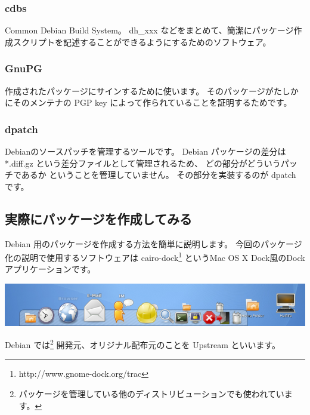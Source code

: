 \documentclass[mingoth,a4paper]{jsarticle}
\begin{document}
\subsubsection{cdbs}
	Common Debian Build System。
	dh\_xxx などをまとめて、簡潔にパッケージ作成スクリプトを記述することができるようにするためのソフトウェア。
	
\subsubsection{GnuPG}
	作成されたパッケージにサインするために使います。
	そのパッケージがたしかにそのメンテナの PGP key によって作られていることを証明するためです。
	
\subsubsection{dpatch}

	Debianのソースパッチを管理するツールです。
	Debian パッケージの差分は *.diff.gz という差分ファイルとして管理されるため、 どの部分がどういうパッチであるか
	ということを管理していません。 その部分を実装するのが dpatch です。


\subsection{実際にパッケージを作成してみる}

	Debian 用のパッケージを作成する方法を簡単に説明します。	
	今回のパッケージ化の説明で使用するソフトウェアは cairo-dock\footnote{http://www.gnome-dock.org/trac} 
	というMac OS X Dock風のDockアプリケーションです。
	
	\begin{center}
		\includegraphics[width=0.5\hsize]{image200611/cairo-dock-ss.png}
	\end{center}

	Debian では\footnote{パッケージを管理している他のディストリビューションでも使われています。}
	開発元、オリジナル配布元のことを Upstream といいます。
\end{document}
